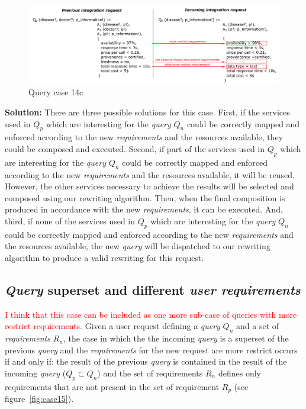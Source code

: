 \begin{figure}[h!]
\center
\includegraphics[scale=0.85]{figures/query-case-14c.pdf}\caption{Query case 14c} \label{fig:case14c}
\end{figure}

\bigskip
\noindent \textbf{Solution:} There are three possible solutions for this case. First, if the services used in $Q_{p}$ which are interesting for the \textsl{query} $Q_{n}$ could be correctly mapped and enforced according to the new \textsl{requirements} and the resources available, they could be composed and executed. Second, if part of the services  used in $Q_{p}$ which are interesting for the \textsl{query} $Q_{n}$ could be correctly mapped and enforced according to the new \textsl{requirements} and the resources available, it will be reused. However, the other services necessary to achieve the results will be selected and composed using our rewriting algorithm. Then, when the final composition is produced in accordance with the new \textsl{requirements}, it can be executed. And, third, if none of the services used in $Q_{p}$ which are interesting for the \textsl{query} $Q_{n}$ could be correctly mapped and enforced according to the new \textsl{requirements} and the resources available, the new \textsl{query} will be dispatched to our rewriting algorithm to produce a valid rewriting for this request.


\subsection{\textsl{Query} superset and different \textsl{user requirements}}
\textcolor{red}{I think that this case can be included as one more sub-case of queries with more restrict requirements.}
Given a user request defining a \textsl{query} $Q_{n}$ and a set of \textsl{requirements} $R_{n}$, the case in which the the incoming \textsl{query} is a superset of the previous \textsl{query} and the \textsl{requirements} for the new request are more restrict occurs if and only if: the result of the previous \textsl{query} is contained in the result of the incoming \textsl{query} ($Q_{p} \subset Q_{n}$) and the set of requirements $R_{n}$ defines only requirements that are not present in the set of requirement $R_{p}$ (see figure~\ref{fig:case15}).

